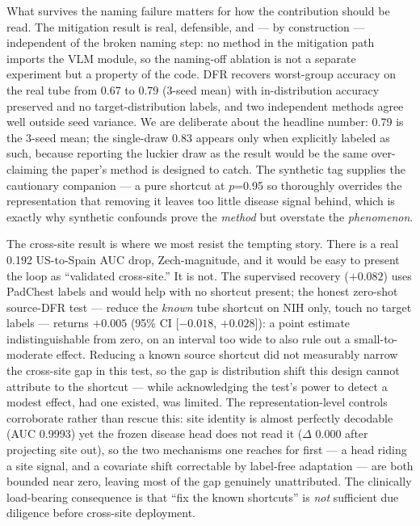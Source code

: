\documentclass{ieeeaccess}
\begin{document}
What survives the naming failure matters for how the contribution should be read. The mitigation result is real, defensible, and --- by construction --- independent of the broken naming step: no method in the mitigation path imports the VLM module, so the naming-off ablation is not a separate experiment but a property of the code. DFR recovers worst-group accuracy on the real tube from 0.67 to 0.79 (3-seed mean) with in-distribution accuracy preserved and no target-distribution labels, and two independent methods agree well outside seed variance. We are deliberate about the headline number: 0.79 is the 3-seed mean; the single-draw 0.83 appears only when explicitly labeled as such, because reporting the luckier draw as the result would be the same over-claiming the paper's method is designed to catch. The synthetic tag supplies the cautionary companion --- a pure shortcut at $p$=0.95 so thoroughly overrides the representation that removing it leaves too little disease signal behind, which is exactly why synthetic confounds prove the \emph{method} but overstate the \emph{phenomenon}.

The cross-site result is where we most resist the tempting story. There is a real 0.192 US-to-Spain AUC drop, Zech-magnitude, and it would be easy to present the loop as ``validated cross-site.'' It is not. The supervised recovery ($+0.082$) uses PadChest labels and would help with no shortcut present; the honest zero-shot source-DFR test --- reduce the \emph{known} tube shortcut on NIH only, touch no target labels --- returns $+0.005$ (95\% CI [$-0.018$, $+0.028$]): a point estimate indistinguishable from zero, on an interval too wide to also rule out a small-to-moderate effect. Reducing a known source shortcut did not measurably narrow the cross-site gap in this test, so the gap is distribution shift this design cannot attribute to the shortcut --- while acknowledging the test's power to detect a modest effect, had one existed, was limited. The representation-level controls corroborate rather than rescue this: site identity is almost perfectly decodable (AUC 0.9993) yet the frozen disease head does not read it ($\Delta$ 0.000 after projecting site out), so the two mechanisms one reaches for first --- a head riding a site signal, and a covariate shift correctable by label-free adaptation --- are both bounded near zero, leaving most of the gap genuinely unattributed. The clinically load-bearing consequence is that ``fix the known shortcuts'' is \emph{not} sufficient due diligence before cross-site deployment.
\end{document}
